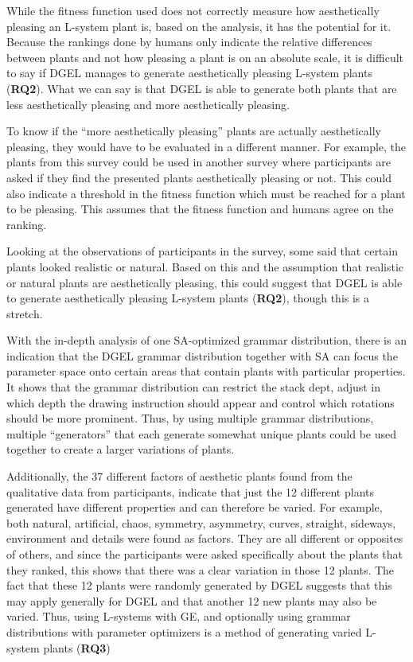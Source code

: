While the fitness function used does not correctly measure how aesthetically pleasing an \gls{L-system} plant is, based on the analysis, it has the potential for it.
Because the rankings done by humans only indicate the relative differences between plants and not how pleasing a plant is on an absolute scale, it is difficult to say if \gls{DGEL} manages to generate aesthetically pleasing \gls{L-system} plants (\textbf{RQ2}).
What we can say is that \gls{DGEL} is able to generate both plants that are less aesthetically pleasing and more aesthetically pleasing.

To know if the ``more aesthetically pleasing'' plants are actually aesthetically pleasing, they would have to be evaluated in a different manner.
For example, the plants from this survey could be used in another survey where participants are asked if they find the presented plants aesthetically pleasing or not.
This could also indicate a threshold in the fitness function which must be reached for a plant to be pleasing.
This assumes that the fitness function and humans agree on the ranking.

Looking at the observations of participants in the survey, some said that certain plants looked realistic or natural.
Based on this and the assumption that realistic or natural plants are aesthetically pleasing, this could suggest that \gls{DGEL} is able to generate aesthetically pleasing \gls{L-system} plants (\textbf{RQ2}), though this is a stretch.

With the in-depth analysis of one \gls{SA}-optimized grammar distribution, there is an indication that the \gls{DGEL} grammar distribution together with \gls{SA} can focus the parameter space onto certain areas that contain plants with particular properties.
It shows that the grammar distribution can restrict the stack dept, adjust in which depth the drawing instruction should appear and control which rotations should be more prominent.
Thus, by using multiple grammar distributions, multiple ``generators'' that each generate somewhat unique plants could be used together to create a larger variations of plants.

Additionally, the 37 different factors of aesthetic plants found from the qualitative data from participants, indicate that just the 12 different plants generated have different properties and can therefore be varied.
For example, both natural, artificial, chaos, symmetry, asymmetry, curves, straight, sideways, environment and details were found as factors.
They are all different or opposites of others, and since the participants were asked specifically about the plants that they ranked, this shows that there was a clear variation in those 12 plants.
The fact that these 12 plants were randomly generated by \gls{DGEL} suggests that this may apply generally for \gls{DGEL} and that another 12 new plants may also be varied.
Thus, using \glspl{L-system} with \gls{GE}, and optionally using grammar distributions with parameter optimizers is a method of generating varied \gls{L-system} plants (\textbf{RQ3})

